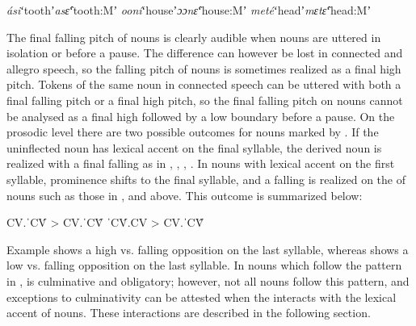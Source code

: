 \documentclass[output=paper]{LSP/langsci}
\begin{document}
\begin{exe}
\ex \label{ex:Petrollino:heightharmony} \begin{xlist}
\ex \textit{ási}\hspace{17mm}ʻtoothʼ\hspace{11mm}\textit{asɛ̂}\hspace{17mm}ʻtooth:Mʼ\label{ex:Petrollino:asi}
\ex \textit{ooní}\hspace{15mm}ʻhouseʼ\hspace{10mm}\textit{ɔɔnɛ̂}\hspace{15mm}ʻhouse:Mʼ\label{ex:Petrollino:house}
\ex \textit{meté}\hspace{15mm}ʻheadʼ\hspace{11mm}\textit{mɛtɛ̂}\hspace{15mm}ʻhead:Mʼ\label{ex:Petrollino:mɛtɛ}
\end{xlist}
\end{exe}

The final falling pitch of  nouns is clearly audible when nouns are uttered in isolation or before a pause. The difference can however be lost in connected and allegro speech, so the falling pitch of  nouns is sometimes realized as a final high pitch. Tokens of the same  noun in connected speech can be uttered with both a final falling pitch or a final high pitch, so the final falling pitch on  nouns cannot be analysed as a final high  followed by a low boundary  before a pause. \newline
On the prosodic level there are two possible outcomes for nouns marked by  . If the uninflected noun has lexical accent on the final syllable, the derived  noun is realized with a final falling  as in , , , . In nouns with lexical accent on the first syllable, prominence shifts to the final syllable, and a falling  is realized on the  of nouns such as those in ,  and  above. This outcome is summarized below:
\begin{exe}
\ex \begin{xlist} \label{ex:Petrollino:35}
\ex \label{CV.CV̂} CV.ˈCV́ > CV.ˈCV̂ \label{ex:Petrollino:35a}
\ex ˈCV́.CV > CV.ˈCV̂ \label{ex:Petrollino:35b}
\end{xlist}
\end{exe}
Example  shows a high vs. falling opposition on the last syllable, whereas  shows a low vs. falling opposition on the last syllable. In  nouns which follow the pattern in ,  is culminative and obligatory; however, not all nouns follow this pattern, and exceptions to culminativity can be attested when the  interacts with the lexical accent of nouns. These interactions are described in the following section.
\end{document}

